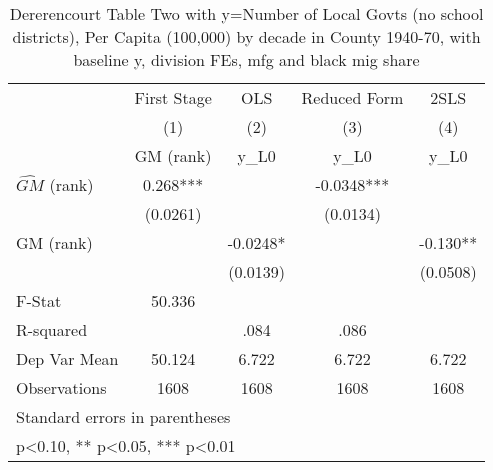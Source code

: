 \begin{table}[htbp]\centering
\def\sym#1{\ifmmode^{#1}\else\(^{#1}\)\fi}
\caption{Dererencourt Table Two with y=Number of Local Govts (no school districts), Per Capita (100,000) by decade in County 1940-70, with baseline y, division FEs, mfg and black mig share}
\begin{tabular}{l*{4}{c}}
\toprule
                    & First Stage   &         OLS   &Reduced Form   &        2SLS   \\
                    &\multicolumn{1}{c}{(1)}&\multicolumn{1}{c}{(2)}&\multicolumn{1}{c}{(3)}&\multicolumn{1}{c}{(4)}\\
                    &\multicolumn{1}{c}{GM  (rank)}&\multicolumn{1}{c}{y\_L0}&\multicolumn{1}{c}{y\_L0}&\multicolumn{1}{c}{y\_L0}\\
\midrule
$\hat{GM}$ (rank)   &       0.268***&               &     -0.0348***&               \\
                    &    (0.0261)   &               &    (0.0134)   &               \\
\addlinespace
GM  (rank)          &               &     -0.0248*  &               &      -0.130** \\
                    &               &    (0.0139)   &               &    (0.0508)   \\
\midrule
F-Stat              &      50.336   &               &               &               \\
R-squared           &               &        .084   &        .086   &               \\
Dep Var Mean        &      50.124   &       6.722   &       6.722   &       6.722   \\
Observations        &        1608   &        1608   &        1608   &        1608   \\
\bottomrule
\multicolumn{5}{l}{\footnotesize Standard errors in parentheses}\\
\multicolumn{5}{l}{\footnotesize * p<0.10, ** p<0.05, *** p<0.01}\\
\end{tabular}
\end{table}
